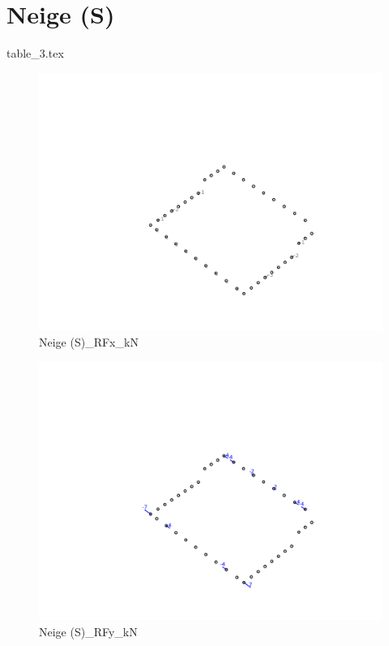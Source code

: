 
    \section{Neige (S)}
    {table_3.tex}

    \begin{figure}[H] %
        \centering %
        \includegraphics[width=\textwidth]{assets/img/graph3D_charges_cas_3_RFx_kN.png} %
        \caption{Neige (S)\_RFx\_kN} %
    \end{figure}

    \begin{figure}[H] %
        \centering %
        \includegraphics[width=\textwidth]{assets/img/graph3D_charges_cas_3_RFy_kN.png} %
        \caption{Neige (S)\_RFy\_kN} %
    \end{figure}

